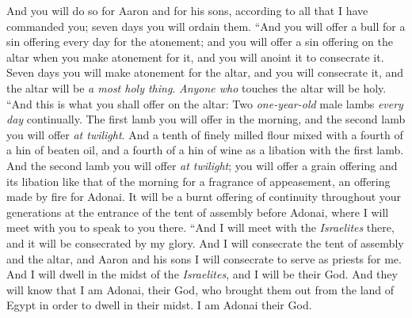 \begin{biblechapter}
\verse And you will do so for Aaron and for his sons, according to all that I have commanded you; seven days you will ordain them.
 “And you will offer a bull for a sin offering every day for the atonement; and you will offer a sin offering on the altar when you make atonement for it, and you will anoint it to consecrate it.
\verse Seven days you will make atonement for the altar, and you will consecrate it, and the altar will be \textit{a most holy thing}. \textit{Anyone who} touches the altar will be holy.
\verse “And this is what you shall offer on the altar: Two \textit{one-year-old} male lambs \textit{every day} continually.
\verse The first lamb you will offer in the morning, and the second lamb you will offer \textit{at twilight}.
\verse And a tenth of finely milled flour mixed with a fourth of a hin of beaten oil, and a fourth of a hin of wine as a libation with the first lamb.
\verse And the second lamb you will offer \textit{at twilight}; you will offer a grain offering and its libation like that of the morning for a fragrance of appeasement, an offering made by fire for Adonai.
\verse It will be a burnt offering of continuity throughout your generations at the entrance of the tent of assembly before Adonai, where I will meet with you to speak to you there.
\verse “And I will meet with the \textit{Israelites} there, and it will be consecrated by my glory.
\verse And I will consecrate the tent of assembly and the altar, and Aaron and his sons I will consecrate to serve as priests for me.
\verse And I will dwell in the midst of the \textit{Israelites}, and I will be their God.
\verse And they will know that I am Adonai, their God, who brought them out from the land of Egypt in order to dwell in their midst. I am Adonai their God.
\end{biblechapter}

